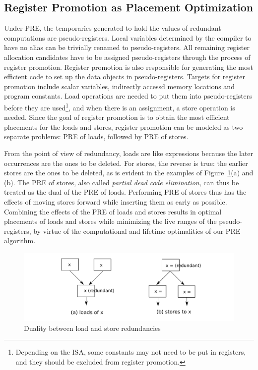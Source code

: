 \subsection{Register Promotion as Placement Optimization}

Under PRE, the temporaries generated to hold the values of redundant 
computations are pseudo-registers.  Local variables determined by the compiler
to have no alias can be trivially renamed to pseudo-registers.   All remaining
register allocation candidates have to be assigned pseudo-registers through 
the process of register promotion.  Register promotion is also responsible
for generating the most efficient code to set up the data objects in
pseudo-registers.  Targets for register promotion include scalar variables,
indirectly accessd memory locations and program constants.  
Load operations are needed to put them into pseudo-registers before
they are used\footnote{Depending on the ISA, some constants may not need to be
put in registers, and they should be excluded from register promotion.}, and
when there is an assignment, a store operation is needed.  Since the goal of
register promotion is to obtain the most efficient placements for the loads and
stores, register promotion can be modeled as two separate problems: PRE of 
loads, followed by PRE of stores.

From the point of view of redundancy, loads are like expressions because the
later occurrences are the ones to be deleted.  For stores, the reverse is true:
the earlier stores are the ones to be deleted, as is evident in the examples
of Figure~\ref{fig: load-store-dual}(a) and (b).  The PRE of stores,
also called \emph{partial dead code elimination}, can thus be treated as the
dual of the PRE of loads.  Performing PRE of stores thus has the effects
of moving stores forward while inserting them as early as possible.  
Combining the effects of the PRE of loads and stores results in optimal
placements of loads and stores while minimizing the live ranges of the
pseudo-registers, by virtue of the computational and lifetime optimalities
of our PRE algorithm.

\begin{figure}
\centering
\includegraphics[scale=0.55]{fig-load-store-dual.pdf}
\caption{Duality between load and store redundancies}
\label{fig: load-store-dual}
\end{figure}

